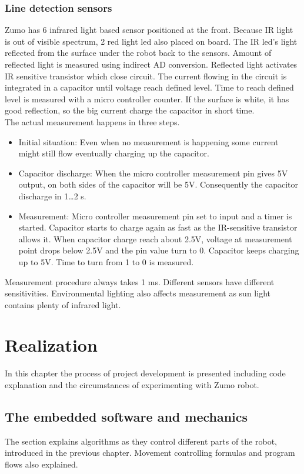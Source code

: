 \documentclass[11pt,a4paper,oneside,article]{memoir}
\begin{document}
\subsection{Line detection sensors}
Zumo has 6 infrared light based sensor positioned at the front. Because IR light is out of visible spectrum, 2 red light led also placed on board. The IR led's light reflected from the surface under the robot back to the sensors. Amount of reflected light is measured using indirect AD conversion. Reflected light activates IR sensitive transistor which close circuit. The current flowing in the circuit is integrated in a capacitor until voltage reach defined level. Time to reach defined level is measured with a micro controller counter. If the surface is white, it has good reflection, so the big current charge the capacitor in short time.\\
The actual measurement happens in three steps.
\begin{itemize}
	\item Initial situation: Even when no measurement is happening some current might still flow eventually charging up the capacitor.
	\item Capacitor discharge: When the micro controller measurement pin gives 5V output, on both sides of the capacitor will be 5V. Consequently the capacitor discharge in 1\ldots2 \textmu s.
	\item Measurement: Micro controller measurement pin set to input and a timer is started. Capacitor starts to charge again as fast as the IR-sensitive transistor allows it. When capacitor charge reach about 2.5V, voltage at measurement point drops below 2.5V and the pin value turn to 0. Capacitor keeps charging up to 5V. Time to turn from 1 to 0 is measured.
\end{itemize}
Measurement procedure always takes 1 ms. Different sensors have different sensitivities. Environmental lighting also affects measurement as sun light contains plenty of infrared light.\cite{Lectures}

\chapter{Realization}
In this chapter the process of project development is presented including code explanation and the circumstances of experimenting with Zumo robot.

\section{The embedded software and mechanics}
The section explains algorithms as they control different parts of the robot, introduced in the previous chapter. Movement controlling formulas and program flows also explained.
\end{document}
